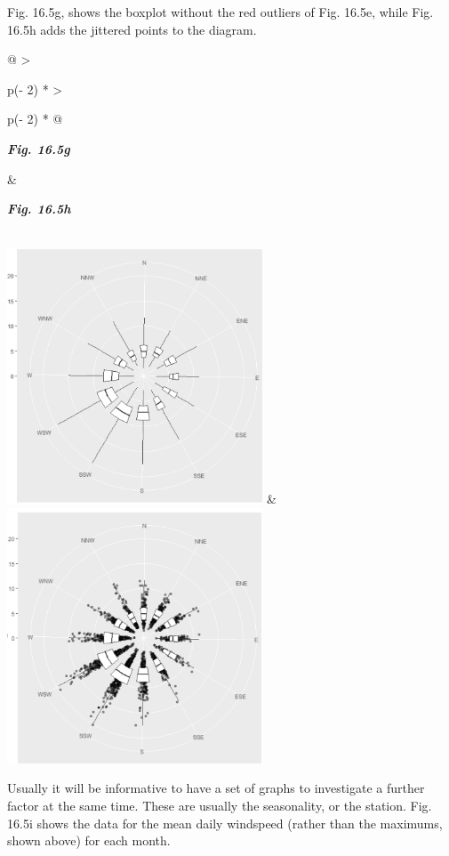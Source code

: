 \documentclass[
  letterpaper,
  DIV=11,
  numbers=noendperiod]{scrreprt}
\begin{document}
Fig. 16.5g, shows the boxplot without the red outliers of Fig. 16.5e,
while Fig. 16.5h adds the jittered points to the diagram.

\begin{longtable}[]{@{}
  >{\raggedright\arraybackslash}p{(\columnwidth - 2\tabcolsep) * }
  >{\raggedright\arraybackslash}p{(\columnwidth - 2\tabcolsep) * }@{}}
\toprule\noalign{}
\begin{minipage}[b]{\linewidth}\raggedright
\textbf{\emph{Fig. 16.5g}}
\end{minipage} & \begin{minipage}[b]{\linewidth}\raggedright
\textbf{\emph{Fig. 16.5h}}
\end{minipage} \\
\midrule\noalign{}
\endhead
\bottomrule\noalign{}
\endlastfoot
\includegraphics[width=2.99266in,height=2.99984in]{figures/Fig16.5g.png}
&
\includegraphics[width=2.97737in,height=2.98806in]{figures/Fig16.5h.png} \\
\end{longtable}

Usually it will be informative to have a set of graphs to investigate a
further factor at the same time. These are usually the seasonality, or
the station. Fig. 16.5i shows the data for the mean daily windspeed
(rather than the maximums, shown above) for each month.
\end{document}
